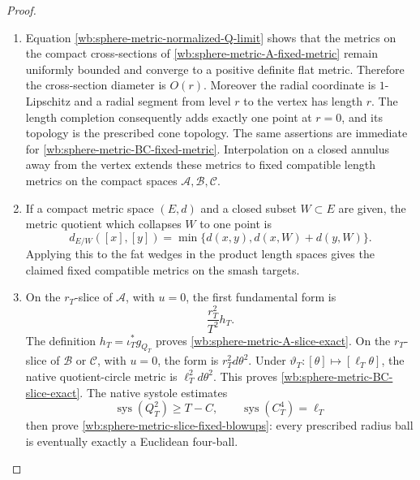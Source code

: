 \begin{proof}
\begin{enumerate}[label=\arabic*.,leftmargin=*]
\item Equation \eqref{wb:sphere-metric-normalized-Q-limit} shows that the metrics on
the compact cross-sections of \eqref{wb:sphere-metric-A-fixed-metric} remain
uniformly bounded and converge to a positive definite flat metric.
Therefore the cross-section diameter is \(O(r)\).  Moreover the radial
coordinate is \(1\)-Lipschitz and a radial segment from level \(r\) to the
vertex has length \(r\).  The length completion consequently adds exactly
one point at \(r=0\), and its topology is the prescribed cone topology.
The same assertions are immediate for
\eqref{wb:sphere-metric-BC-fixed-metric}.  Interpolation on a closed annulus
away from the vertex extends these metrics to fixed compatible length
metrics on the compact spaces \(\mathcal A,\mathcal B,\mathcal C\).

\item If a compact metric space \((E,d)\) and a closed subset \(W\subset E\) are
given, the metric quotient which collapses \(W\) to one point is
\[
 d_{E/W}([x],[y])
 =\min\{d(x,y),d(x,W)+d(y,W)\}.
\]
Applying this to the fat wedges in the product length spaces gives the
claimed fixed compatible metrics on the smash targets.

\item On the \(r_T\)-slice of \(\mathcal A\), with \(u=0\), the first fundamental
form is
\[
 \frac{r_T^2}{T^2}h_T.
\]
The definition \(h_T=\iota_T^*g_{Q_T}\) proves
\eqref{wb:sphere-metric-A-slice-exact}.  On the \(r_T\)-slice of
\(\mathcal B\) or \(\mathcal C\), with \(u=0\), the form is
\(r_T^2d\theta^2\).  Under
\(\vartheta_T:[\theta]\mapsto[\ell_T\theta]\), the native quotient-circle
metric is \(\ell_T^2d\theta^2\).  This proves
\eqref{wb:sphere-metric-BC-slice-exact}.  The native systole estimates
\[
 \operatorname{sys}(Q_T^2)\geq T-C,
 \qquad
 \operatorname{sys}(C_T^4)=\ell_T
\]
then prove \eqref{wb:sphere-metric-slice-fixed-blowups}: every prescribed
radius ball is eventually exactly a Euclidean four-ball.


\end{enumerate}
\end{proof}
